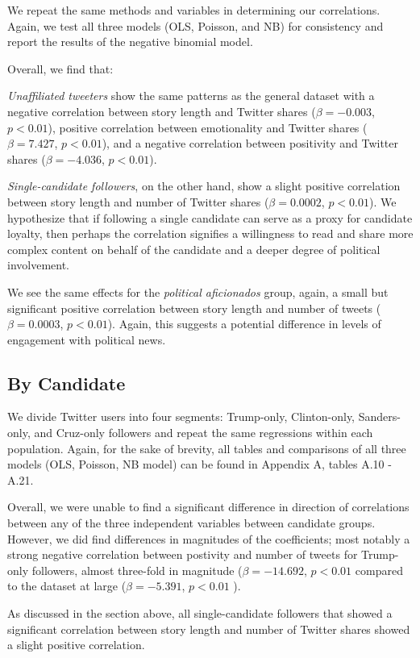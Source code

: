 \documentclass[letterpaper]{article}
\begin{document}
We repeat the same methods and variables in determining our correlations. Again, we test all three models (OLS, Poisson, and NB) for consistency and report the results of the negative binomial model.

Overall, we find that: 

\emph{Unaffiliated tweeters} show the same patterns as the general dataset with a negative correlation between story length and Twitter shares ($\beta=-0.003$, $p<0.01$), positive correlation between emotionality and Twitter shares ($\beta=7.427$, $p<0.01$), and a negative correlation between positivity and Twitter shares ($\beta=-4.036$, $p<0.01$).

\emph{Single-candidate followers}, on the other hand, show a slight positive correlation between story length and number of Twitter shares ($\beta=0.0002$, $p<0.01$). We hypothesize that if following a single candidate can serve as a proxy for candidate loyalty, then perhaps the correlation signifies a willingness to read and share more complex content on behalf of the candidate and a deeper degree of political involvement.

We see the same effects for the \emph{political aficionados} group, again, a small but significant positive correlation between story length and number of tweets ($\beta=0.0003$, $p<0.01$). Again, this suggests a potential difference in levels of engagement with political news.


\subsection{By Candidate} 

We divide Twitter users into four segments: Trump-only, Clinton-only, Sanders-only, and Cruz-only followers and repeat the same regressions within each population. Again, for the sake of brevity, all tables and comparisons of all three models (OLS, Poisson, NB model) can be found in Appendix A, tables A.10 - A.21.

Overall, we were unable to find a significant difference in direction of correlations between any of the three independent variables between candidate groups. However, we did find differences in magnitudes of the coefficients; most notably a strong negative correlation between postivity and number of tweets for Trump-only followers, almost three-fold in magnitude ($\beta=-14.692$, $p<0.01$ compared to the dataset at large ($\beta=-5.391$, $p<0.01$ ).

As discussed in the section above, all single-candidate followers that showed a significant correlation between story length and number of Twitter shares showed a slight positive correlation.
\end{document}
